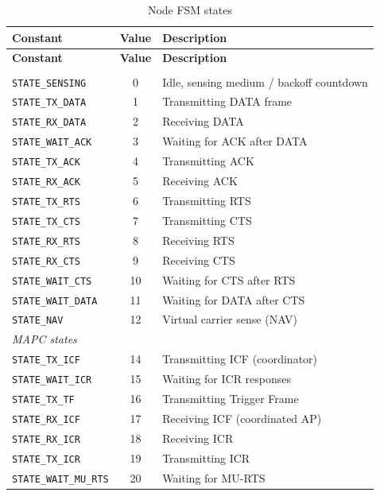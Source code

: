 \documentclass[11pt,a4paper]{article}
\begin{document}
\begin{longtable}{l c p{7.5cm}}
\caption{Node FSM states}\label{tab:states}\\
\toprule
\textbf{Constant} & \textbf{Value} & \textbf{Description} \\
\midrule
\endfirsthead
\toprule
\textbf{Constant} & \textbf{Value} & \textbf{Description} \\
\midrule
\endhead
\bottomrule
\endlastfoot
\multicolumn{3}{l}{\textit{Core 802.11 states}} \\
\texttt{STATE\_SENSING}     & 0  & Idle, sensing medium / backoff countdown \\
\texttt{STATE\_TX\_DATA}    & 1  & Transmitting DATA frame \\
\texttt{STATE\_RX\_DATA}    & 2  & Receiving DATA \\
\texttt{STATE\_WAIT\_ACK}   & 3  & Waiting for ACK after DATA \\
\texttt{STATE\_TX\_ACK}     & 4  & Transmitting ACK \\
\texttt{STATE\_RX\_ACK}     & 5  & Receiving ACK \\
\texttt{STATE\_TX\_RTS}     & 6  & Transmitting RTS \\
\texttt{STATE\_TX\_CTS}     & 7  & Transmitting CTS \\
\texttt{STATE\_RX\_RTS}     & 8  & Receiving RTS \\
\texttt{STATE\_RX\_CTS}     & 9  & Receiving CTS \\
\texttt{STATE\_WAIT\_CTS}   & 10 & Waiting for CTS after RTS \\
\texttt{STATE\_WAIT\_DATA}  & 11 & Waiting for DATA after CTS \\
\texttt{STATE\_NAV}         & 12 & Virtual carrier sense (NAV) \\
\midrule
\multicolumn{3}{l}{\textit{MAPC states}} \\
\texttt{STATE\_TX\_ICF}     & 14 & Transmitting ICF (coordinator) \\
\texttt{STATE\_WAIT\_ICR}   & 15 & Waiting for ICR responses \\
\texttt{STATE\_TX\_TF}      & 16 & Transmitting Trigger Frame \\
\texttt{STATE\_RX\_ICF}     & 17 & Receiving ICF (coordinated AP) \\
\texttt{STATE\_RX\_ICR}     & 18 & Receiving ICR \\
\texttt{STATE\_TX\_ICR}     & 19 & Transmitting ICR \\
\texttt{STATE\_WAIT\_MU\_RTS} & 20 & Waiting for MU-RTS \\

\end{longtable}
\end{document}
